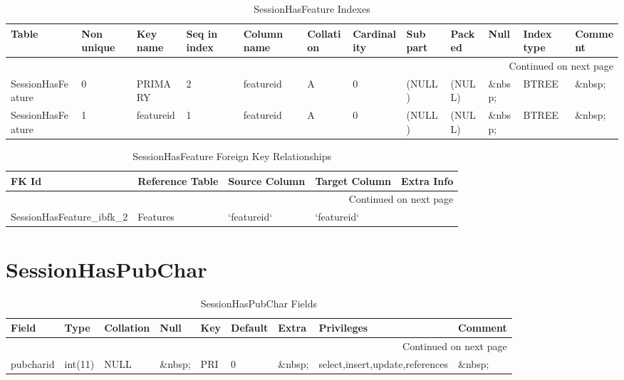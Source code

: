 \documentclass[tablesignature,landscape]{scrartcl}
\begin{document}
\begin{longtable}{|l|l|l|l|l|l|l|l|l|l|l|l|}
\caption{SessionHasFeature Indexes} \label{tbl:sessionhasfeatureindexes}\\
\hline
 Table              &  Non unique  &  Key name   &  Seq in index  &  Column name  &  Collation  &  Cardinality  &  Sub part  &  Packed  &  Null     &  Index type  &  Comment \\
\hline
\endhead
\hline\multicolumn{12}{r}{Continued on next page}\
\endfoot
\endlastfoot
\hline
 SessionHasFeature  &           0  &  PRIMARY    &             1  &  sessionid    &  A          &            0  &  (NULL)    &  (NULL)  &  \&nbsp;  &  BTREE       &  \&nbsp;  \\
 SessionHasFeature  &           0  &  PRIMARY    &             2  &  featureid    &  A          &            0  &  (NULL)    &  (NULL)  &  \&nbsp;  &  BTREE       &  \&nbsp;  \\
 SessionHasFeature  &           1  &  featureid  &             1  &  featureid    &  A          &            0  &  (NULL)    &  (NULL)  &  \&nbsp;  &  BTREE       &  \&nbsp;  \\
\hline
\end{longtable}


\begin{longtable}{|l|l|l|l|l|}
\caption{SessionHasFeature Foreign Key Relationships} \label{tbl:sessionhasfeaturefkr}\\
\hline
 FK Id                           &  Reference Table  &  Source Column  &  Target Column  &  Extra Info \\
\hline
\endhead
\hline\multicolumn{5}{r}{Continued on next page}\
\endfoot
\endlastfoot
\hline
 SessionHasFeature\_{}ibfk\_{}1  &  Sessions         &  `sessionid`    &  `sessionid`    &              \\
 SessionHasFeature\_{}ibfk\_{}2  &  Features         &  `featureid`    &  `featureid`    &              \\
\hline
\end{longtable}
\section{SessionHasPubChar}
\label{sec-27}


\begin{longtable}{|l|l|l|l|l|l|l|l|l|}
\caption{SessionHasPubChar Fields} \label{tbl:sessionhaspubcharfields}\\
\hline
 Field      &  Type     &  Collation  &  Null     &  Key  &  Default  &  Extra    &  Privileges                       &  Comment \\
\hline
\endhead
\hline\multicolumn{9}{r}{Continued on next page}\
\endfoot
\endlastfoot
\hline
 sessionid  &  int(11)  &  NULL       &  \&nbsp;  &  PRI  &        0  &  \&nbsp;  &  select,insert,update,references  &  \&nbsp;  \\
 pubcharid  &  int(11)  &  NULL       &  \&nbsp;  &  PRI  &        0  &  \&nbsp;  &  select,insert,update,references  &  \&nbsp;  \\
\hline
\end{longtable}
\end{document}
